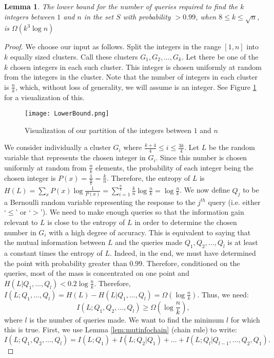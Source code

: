 \documentclass[12pt]{article}
\newtheorem{lemma}[theorem]{Lemma}
\newcommand{\Om}{\Omega}
\begin{document}
\begin{lemma} 
The lower bound for the number of queries required to find the $k$ integers  between $1$ and $n$ in the set $S$ with probability $>0.99$, when $8 \leq k\le \sqrt{n}$, is $\Omega(k^3\log{n})$
\end{lemma}
\begin{proof}
We choose our input as follows. Split the integers in the range $[1,n]$ into $k$ equally sized clusters. Call these clusters $G_1, G_2, \ldots, G_k$. Let there be one of the $k$ chosen integers in each such cluster. This integer is chosen uniformly at random from the integers in the cluster. Note that the number of integers in each cluster is $\frac{n}{k}$, which, without loss of generality, we will assume is an integer. See Figure \ref{fig:lowerbound} for a visualization of this.

\begin{figure}[ht]
	\centering
		\texttt{[image: LowerBound.png]}
	\caption{Visualization of our partition of the integers between $1$ and $n$}
	\label{fig:lowerbound}
\end{figure} 

We consider individually a cluster $G_i$ where $\frac{k+4}{4} \leq i \leq \frac{3k}{4}$. Let $L$ be the random variable that represents the chosen integer in $G_i$. Since this number is chosen uniformly at random from $\frac{n}{k}$ elements, the probability of each integer being the chosen integer is $P(x) = \frac{1}{\frac{n}{k}}=\frac{k}{n}$. Therefore, the entropy of $L$ is $H(L) = \sum_{x} P(x)\log{\frac{1}{P(x)}} = \sum_{i = 1}^{\frac{n}{k}} \frac{k}{n} \log{\frac{n}{k}} =  \log{\frac{n}{k}}$. We now define $Q_j$ to be a Bernoulli random variable representing the response to the $j^{th}$ query (i.e. either `$\leq$' or `$>$'). We need to make enough queries so that the information gain relevant to $L$ is close to the entropy of $L$ in order to determine the chosen number in $G_i$ with a high degree of accuracy. This is equivalent to saying that the mutual information between $L$ and the queries made $Q_1, Q_2, \ldots, Q_l$ is at least a constant times the entropy of $L$. Indeed, in the end, we must have determined the point with probability greater than $0.99$. Therefore, conditioned on the queries, most of the mass is concentrated on one point and $H(L|Q_1,\ldots,Q_l) < 0.2 \log{\frac{n}{k}}$. Therefore, $I(L;Q_1,\ldots,Q_l) = H(L) - H(L|Q_1,\ldots,Q_l) = \Om(\log{\frac{n}{k}})$. Thus, we need: 
\begin{equation} \label{eq:mutinfoentropy}
I(L;Q_1, Q_2, \ldots, Q_l) \geq \Om(\log{\frac{n}{k}}),
\end{equation}
where $l$ is the number of queries made. We want to find the minimum $l$ for which this is true. First, we use Lemma \ref{lem:mutinfochain} (chain rule) to write:
\begin{equation} \label{eq:mutinfoLandQ} I(L;Q_1, Q_2, \ldots, Q_l) = I(L;Q_1) + I(L;Q_2|Q_1) + \ldots + I(L;Q_l|Q_{l-1},\ldots,Q_2,Q_1).
\end{equation}


\end{proof}
\end{document}
